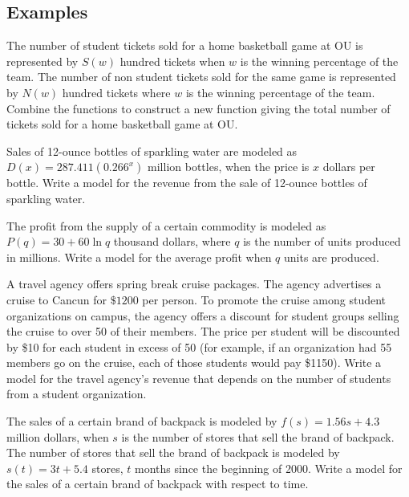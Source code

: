 \documentclass[notes]{subfiles}
\begin{document}
	\subsection*{Examples}
		\begin{ex}
			The number of student tickets sold for a home basketball game at OU is represented by $S(w)$ hundred tickets when $w$ is the winning percentage of the team.  The number of non student tickets sold for the same game is represented by $N(w)$ hundred tickets where $w$ is the winning percentage of the team.  Combine the functions to construct a new function giving the total number of tickets sold for a home basketball game at OU.
		\end{ex}
			\newpage
			
		\begin{ex}
			Sales of 12-ounce bottles of sparkling water are modeled as $D(x) = 287.411(0.266^x)$ million bottles, when the price is $x$ dollars per bottle.  Write a model for the revenue from the sale of 12-ounce bottles of sparkling water.
		\end{ex}
			
		\begin{ex}
			The profit from the supply of a certain commodity is modeled as $P(q) = 30 + 60\ln q$ thousand dollars, where $q$ is the number of units produced in millions.  Write a model for the average profit when $q$ units are produced.
		\end{ex}
			\newpage
			
		\begin{ex}
			A travel agency offers spring break cruise packages.  The agency advertises a cruise to Cancun for $\$1200$ per person.  To promote the cruise among student organizations on campus, the agency offers a discount for student groups selling the cruise to over 50 of their members.  The price per student will be discounted by \$10 for each student in excess of 50 (for example, if an organization had 55 members go on the cruise, each of those students would pay \$1150).  Write a model for the travel agency's revenue that depends on the number of students from a student organization.
		\end{ex}
			
		\begin{ex}
			The sales of a certain brand of backpack is modeled by $f(s) = 1.56s + 4.3$ million dollars, when $s$ is the number of stores that sell the brand of backpack.  The number of stores that sell the brand of backpack is modeled by $s(t) = 3t+5.4$ stores, $t$ months since the beginning of 2000.  Write a model for the sales of a certain brand of backpack with respect to time.
		\end{ex}
			\newpage
			
\end{document}
